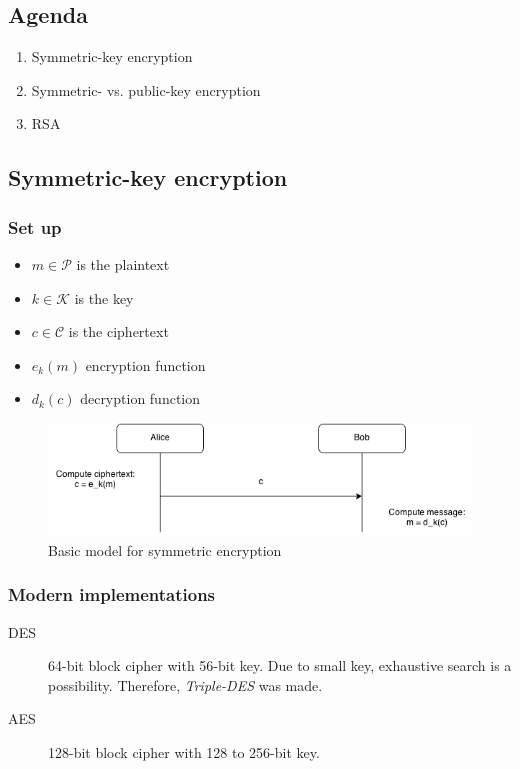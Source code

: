 
\subsection{Agenda}
\begin{enumerate}
\item Symmetric-key encryption
\item Symmetric- vs. public-key encryption
\item RSA
\end{enumerate}
\subsection{Symmetric-key encryption}
\subsubsection{Set up}
\begin{itemize}
  \item $m \in \mathcal{P}$ is the plaintext
  \item $k \in \mathcal{K}$ is the key
  \item $c \in \mathcal{C}$ is the ciphertext
  \item $e_k(m)$ encryption function
  \item $d_k(c)$ decryption function
\end{itemize}

\begin{figure}[H]
  \begin{centering}
    \includegraphics[width=15cm]{images/1-sym-enc}
    \caption{Basic model for symmetric encryption}
  \end{centering}
  \label{fig:sym-enc}
\end{figure}

\subsubsection{Modern implementations}
\begin{description}
\item[DES] 64-bit block cipher with 56-bit key. Due to small key,
  exhaustive search is a possibility. Therefore, \emph{Triple-DES} was
  made.
\item[AES] 128-bit block cipher with 128 to 256-bit key.
\end{description}

